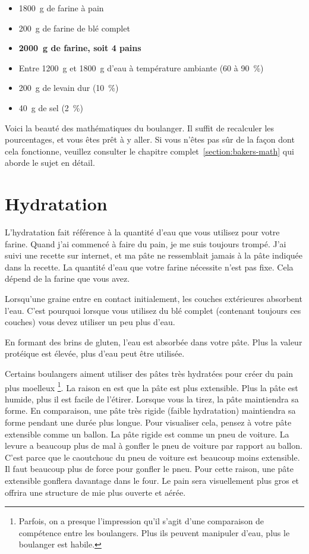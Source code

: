 \begin{itemize}
  \item \qty{1800}{\gram} de farine à pain
  \item \qty{200}{\gram} de farine de blé complet
  \item \textbf{\qty{2000}{\gram} de farine, soit 4 pains}
  \item Entre \qty{1200}{\gram} et \qty{1800}{\gram} d'eau à température ambiante (60 à \qty{90}{\percent})
  \item \qty{200}{\gram} de levain dur (\qty{10}{\percent})
  \item \qty{40}{\gram} de sel (\qty{2}{\percent})
\end{itemize}Voici la beauté des mathématiques du boulanger. Il suffit de recalculer les pourcentages, et vous
êtes prêt à y aller. Si vous n'êtes pas sûr de la façon dont cela fonctionne, veuillez consulter
le chapitre complet~\ref{section:bakers-math} qui aborde le sujet en détail.

\section{Hydratation}

L'hydratation fait référence à la quantité d'eau que vous utilisez pour votre farine. Quand
j'ai commencé à faire du pain, je me suis toujours trompé. J'ai suivi une recette sur
internet, et ma pâte ne ressemblait jamais à la pâte indiquée dans la recette.
La quantité d'eau que votre farine nécessite n'est pas fixe. Cela dépend de la farine
que vous avez.

Lorsqu'une graine entre en contact initialement, les couches extérieures absorbent l'eau.
C'est pourquoi lorsque vous utilisez du blé complet (contenant toujours ces couches) vous devez
utiliser un peu plus d'eau.

En formant des brins de gluten, l'eau est absorbée dans votre pâte. Plus la
valeur protéique est élevée, plus d'eau peut être utilisée.

Certains boulangers aiment utiliser des pâtes très hydratées pour créer du pain plus moelleux
\footnote{Parfois, on a presque l'impression qu'il s'agit d'une comparaison de compétence
entre les boulangers. Plus ils peuvent manipuler d'eau, plus le boulanger est habile.}.
La raison en est
que la pâte est plus extensible. Plus la pâte est humide, plus il est facile
de l'étirer. Lorsque vous la tirez, la pâte maintiendra sa
forme. En comparaison, une pâte très rigide (faible hydratation) maintiendra sa
forme pendant une durée plus longue. Pour visualiser cela, pensez à votre pâte extensible
comme un ballon. La pâte rigide est comme un pneu de voiture.
La levure a beaucoup plus de mal à gonfler le pneu de voiture par rapport au ballon.
C'est parce que le caoutchouc du pneu de voiture est beaucoup moins extensible.
Il faut beaucoup plus de force pour gonfler le pneu. Pour cette raison,
une pâte extensible gonflera davantage dans le four. Le pain sera
visuellement plus gros et offrira une structure de mie plus ouverte et aérée.

